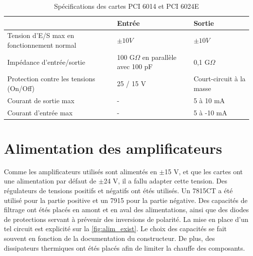 \documentclass{report}
\begin{document}
\begin{center}
\begin{table}[h!]
\begin{tabular}{l|l|l|}
\cline{2-3}
                                                                 & Entrée                                 & Sortie                   \\ \hline
\multicolumn{1}{|l|}{Tension d'E/S max en fonctionnement normal} & $\pm 10 V$                             & $\pm 10 V$               \\ \hline
\multicolumn{1}{|l|}{Impédance d'entrée/sortie}                  & 100 G$\Omega$ en parallèle avec 100 pF & 0,1 G$\Omega$            \\ \hline
\multicolumn{1}{|l|}{Protection contre les tensions (On/Off)}    & 25 / 15 V                              & Court-circuit à la masse \\ \hline
\multicolumn{1}{|l|}{Courant de sortie max}                      & -                                      & 5 à 10 mA                \\ \hline
\multicolumn{1}{|l|}{Courant d'entrée max}                       & -                                      & 5 à -10 mA               \\ \hline
\end{tabular}
\caption{Spécifications des cartes PCI 6014 et PCI 6024E}
\end{table}
\end{center}

\section{Alimentation des amplificateurs}
Comme les amplificateurs utilisés sont alimentés en $\pm$15 V, et que les cartes ont une alimentation par défaut de $\pm$24 V, il a fallu adapter cette tension. Des régulateurs de tensions positifs et négatifs ont étés utilisés. Un 7815CT a été utilisé pour la partie positive et un 7915 pour la partie négative. Des capacités de filtrage ont étés placés en amont et en aval des alimentations, ainsi que des diodes de protections servant à prévenir des inversions de polarité. La mise en place d'un tel circuit est explicité sur la  \ref{fig:alim_exist}. Le choix des capacités se fait souvent en fonction de la documentation du constructeur. De plus, des dissipateurs thermiques ont étés placés afin de limiter la chauffe des composants.
\end{document}
